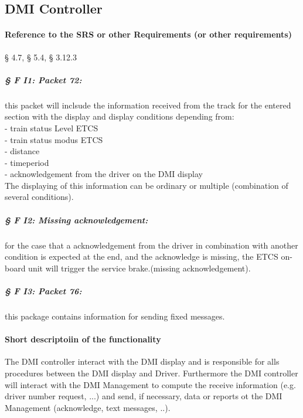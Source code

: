 \subsection{DMI Controller}

\paragraph{Reference to the SRS or other Requirements (or other requirements)}

§ 4.7, § 5.4, § 3.12.3

\subparagraph{§ F I1: Packet 72:} this packet will inclsude the information received from the track for the entered section with the display and display conditions depending from:\\
  - train status Level ETCS\\
  - train status modus ETCS\\
  - distance\\
  - timeperiod\\
  - acknowledgement from the driver on the DMI display\\
The displaying of this information can be ordinary or multiple (combination of several conditions). \\

\subparagraph{§ F I2: Missing acknowledgement:}
for the case that a acknowledgement from the driver in combination with another condition is expected at the end, and the acknowledge is missing, the ETCS on-board unit will trigger the service brake.(missing acknowledgement).\\

\subparagraph{§ F I3: Packet 76:} this package contains information for sending fixed messages. \\

\paragraph{Short descriptoiin of the functionality}
The DMI controller interact with the DMI display and is responsible for alls procedures between the DMI display and Driver. Furthermore the DMI controller will interact with the DMI Management to compute the receive information (e.g. driver number request, ...) and send, if necessary, data or reports ot the DMI Management (acknowledge, text messages, ..).\\

